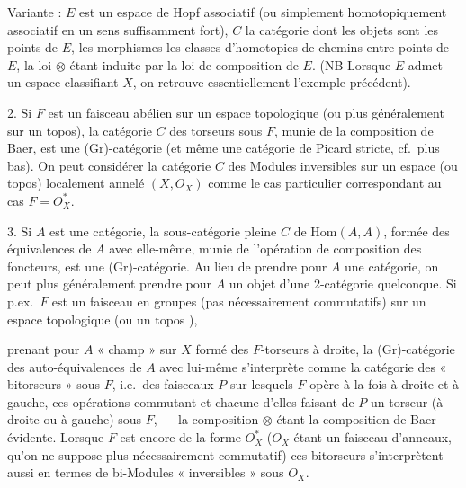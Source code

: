 \documentclass[11pt,a4paper]{article}
\begin{document}
Variante : $E$ est un espace de Hopf associatif (ou simplement
homotopiquement associatif en un sens suffisamment fort), $C$ la catégorie
dont les objets sont les points de $E$, les morphismes les classes
d'homotopies de chemins entre points de $E$, la loi $\otimes$ étant induite
par la loi de composition de $E$. (NB Lorsque $E$ admet un espace
classifiant $X$, on retrouve essentiellement l'exemple précédent).

 2. Si $F$ est un faisceau abélien sur un espace
topologique (ou plus généralement sur un topos), la catégorie $C$ des
torseurs sous $F$, munie de la composition de Baer, est une (Gr)-catégorie
(et même une catégorie de Picard stricte, cf.\ plus bas). On peut considérer
la catégorie $C$ des Modules inversibles sur un espace (ou topos)
localement annelé $(X, O_{X})$ comme le cas particulier correspondant au cas
$F = O_{X}^{*}$.

 3. Si $A$ est une catégorie, la sous-catégorie pleine $C$
de $\mathrm{Hom}(A,A)$, formée des équivalences de $A$ avec elle-même, munie
de l'opération de composition des foncteurs, est une (Gr)-catégorie. Au lieu
de prendre pour $A$ une catégorie, on peut plus généralement prendre pour
$A$ un objet d'une 2-catégorie quelconque. Si p.ex.\ $F$ est un faisceau en
groupes (pas nécessairement commutatifs) sur un espace topologique (ou un
topos ),

prenant pour $A$  « champ » sur $X$ formé des $F$-torseurs à
droite, la (Gr)-catégorie des auto-équivalences de $A$ avec lui-même
s'interprète comme la catégorie des « bitorseurs » sous $F$, i.e.\ des
faisceaux $P$ sur lesquels $F$ opère à la fois à droite et à gauche, ces
opérations commutant et chacune d'elles faisant de $P$ un torseur (à droite
ou à gauche) sous $F$, — la composition $\otimes$ étant la composition de
Baer évidente. Lorsque $F$ est encore de la forme $O_{X}^{*}$ ($O_{X}$ étant
un faisceau d'anneaux, qu'on ne suppose plus nécessairement commutatif) ces
bitorseurs s'interprètent aussi en termes de bi-Modules « inversibles » sous
$O_{X}$.
\end{document}

